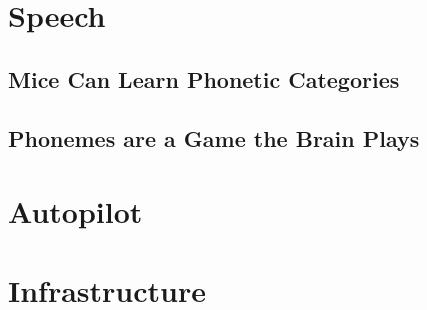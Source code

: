 
\maketitle
\clearpage



\tableofcontents%
%
\mainmatter



\part{Speech}

\chapter{Mice Can Learn Phonetic Categories}





\chapter{Phonemes are a Game the Brain Plays}





\part{Autopilot}





\part{Infrastructure}



\begin{fullwidth}



\end{fullwidth}